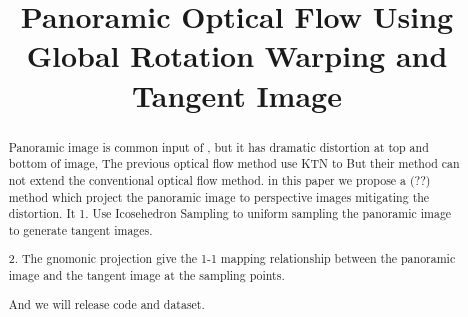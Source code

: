 \documentclass{bmvc2k}
\title{Panoramic Optical Flow Using Global Rotation Warping and Tangent Image}
\begin{document}
\maketitle

\begin{abstract}

Panoramic image is common input of , but it has dramatic distortion at top and bottom of image, 
The previous optical flow method use KTN to 
But their method can not extend the conventional optical flow method.
in this paper we propose a (??) method which project the panoramic image to perspective images mitigating the distortion.
It 
1. Use Icosehedron Sampling to uniform sampling the panoramic image to generate tangent images.

2. The gnomonic projection give the 1-1 mapping relationship between the panoramic image and the tangent image at the sampling points.

And we will release code and dataset.

\end{abstract}















\end{document}
